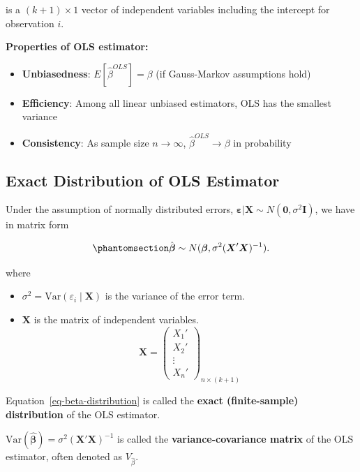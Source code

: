 \documentclass[
  12pt,
  letterpaper,
]{scrbook}
\providecommand{\tightlist}{%
  \setlength{\itemsep}{0pt}\setlength{\parskip}{0pt}}
\renewcommand{\tightlist}{\setlength{\itemsep}{0.5\baselineskip}\setlength{\parskip}{0.2\baselineskip}}
\newcommand{\bX}{\boldsymbol{X}}
\newcommand{\bbeta}{\boldsymbol{\beta}}
\newcommand{\var}{\mathrm{Var}}
\theoremstyle{plain}
\theoremstyle{definition}
\theoremstyle{remark}
\begin{document}
is a \((k+1) \times 1\) vector of independent variables including the
intercept for observation \(i\).

\textbf{Properties of OLS estimator:}

\begin{itemize}
\tightlist
\item
  \textbf{Unbiasedness}: \(E[\hat{\beta}^{OLS}] = \beta\) (if
  Gauss-Markov assumptions hold)
\item
  \textbf{Efficiency}: Among all linear unbiased estimators, OLS has the
  smallest variance
\item
  \textbf{Consistency}: As sample size \(n \to \infty\),
  \(\hat{\beta}^{OLS} \to \beta\) in probability
\end{itemize}

\subsection{Exact Distribution of OLS
Estimator}\label{exact-distribution-of-ols-estimator}

Under the assumption of normally distributed errors,
\(\boldsymbol{\varepsilon} \vert \boldsymbol{X} \sim N(\boldsymbol{0}, \sigma^2\boldsymbol{I})\),
we have in matrix form

\begin{equation}\phantomsection\label{eq-beta-distribution}{
\hat{\boldsymbol{\beta}} \sim N(\boldsymbol{\beta}, \sigma^2 (\boldsymbol{X}'\boldsymbol{X})^{-1}).
}\end{equation}

where

\begin{itemize}
\tightlist
\item
  \(\sigma^2 = \var (\varepsilon_i \mid \bX)\) is the variance of the
  error term.
\item
  \(\bX\) is the matrix of independent variables. \[
  \bX = \begin{pmatrix}
     X_1' \\ X_2' \\ \vdots \\ X_n'
  \end{pmatrix}_{n \times (k+1)}
  \]
\end{itemize}

Equation~\ref{eq-beta-distribution} is called the \textbf{exact
(finite-sample) distribution} of the OLS estimator.

\(\var(\hat{\bbeta}) = \sigma^2 (\boldsymbol{X}'\boldsymbol{X})^{-1}\)
is called the \textbf{variance-covariance matrix} of the OLS estimator,
often denoted as \(V_{\hat\beta}.\)
\end{document}
